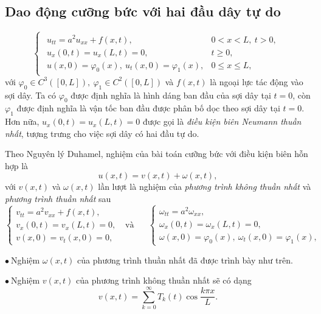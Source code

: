 \documentclass[10pt, a4paper]{article}
\begin{document}
	\subsection{Dao động cưỡng bức với hai đầu dây tự do}
	\vspace{2mm}
	\begin{tcolorbox}[enhanced,colback=blue!5!white,colframe=blue!75!black,sharp corners=all,shadow={0mm}{0mm}{-1.5mm}%
		{fill=blue!75!red,opacity=0.3},title=\textbf{Dạng của bài toán}]
		$$\begin{cases}
			\begin{array}{ll}
				u_{tt}=a^2u_{xx}+f(x,t), & 0<x<L,~t>0,\\
				u_x(0,t)=u_x(L,t)=0, & t\ge0,\\
				u(x,0)=\varphi_0(x),~u_t(x,0)=\varphi_1(x), & 0\le x\le L,
			\end{array}
		\end{cases}$$
		với $\varphi_0\in C^3([0,L]),~\varphi_1\in C^2([0,L])$ và $f(x,t)$ là ngoại lực tác động vào sợi dây.\vskip7pt
		\quad Ta có $\varphi_0$ được định nghĩa là hình dáng ban đầu của sợi dây tại $t=0$, còn $\varphi_1$ được định nghĩa là vận tốc ban đầu được phân bố dọc theo sợi dây tại $t=0$.\vskip7pt
		\quad Hơn nữa, $u_x(0,t)=u_x(L,t)=0$ được gọi là \textit{điều kiện biên Neumann thuần nhất}, tượng trưng cho việc sợi dây có hai đầu tự do.
	\end{tcolorbox}
	\vspace{2mm}
	Theo Nguyên lý Duhamel, nghiệm của bài toán cưỡng bức với điều kiện biên hỗn hợp là $$u(x,t)=v(x,t)+\omega(x,t),$$
	với $v(x,t)$ và $\omega(x,t)$ lần lượt là nghiệm của \textit{phương trình không thuần nhất} và \textit{phương trình thuần nhất} sau $$\begin{cases}
		v_{tt}=a^2v_{xx}+f(x,t),\\
		v_x(0,t)=v_x(L,t)=0,\\
		v(x,0)=v_t(x,0)=0,
	\end{cases}\text{~~và~~~~~}\begin{cases}
		\omega_{tt}=a^2\omega_{xx},\\
		\omega_x(0,t)=\omega_x(L,t)=0,\\
		\omega(x,0)=\varphi_0(x),~\omega_t(x,0)=\varphi_1(x),
	\end{cases}$$
	
	$\bullet~$Nghiệm $\omega(x,t)$ của phương trình thuần nhất đã được trình bày như trên.\vskip7pt
	
	$\bullet~$Nghiệm $v(x,t)$ của phương trình không thuần nhất sẽ có dạng
	$$v(x,t)=\displaystyle\sum_{k=0}^\infty T_k(t)\cos\dfrac{k\pi x}{L}.$$
	
\end{document}
